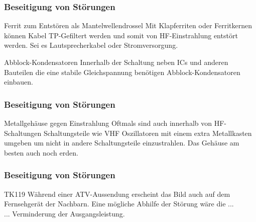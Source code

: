 \begin{frame}
    \frametitle{Beseitigung von Störungen}
    \begin{center}
	\begin{block}{Ferrit zum Entstören als Mantelwellendrossel}
		Mit Klapferriten oder Ferritkernen können Kabel TP-Gefiltert werden und somit von HF-Einstrahlung entstört werden. Sei es Lautsprecherkabel oder Stromversorgung.
	\end{block}
	\begin{block}{Abblock-Kondensatoren}
		Innerhalb der Schaltung neben ICs und anderen Bauteilen die eine stabile Gleichspannung benötigen Abblock-Kondensatoren einbauen.
	\end{block}
    \end{center}
\end{frame}

\begin{frame}
    \frametitle{Beseitigung von Störungen}
    \begin{center}
	\begin{block}{Metallgehäuse gegen Einstrahlung}
		Oftmals sind auch innerhalb von HF-Schaltungen Schaltungsteile wie VHF Oszillatoren mit einem extra Metallkasten umgeben um nicht in andere Schaltungsteile einzustrahlen. Das Gehäuse am besten auch noch erden.
	\end{block}
    \end{center}
\end{frame}

\begin{frame}
    \frametitle{Beseitigung von Störungen}
    \begin{center}
	\begin{block}{TK119}
	Während einer ATV-Aussendung erscheint das Bild auch auf dem Fernsehgerät der Nachbarn. Eine mögliche Abhilfe der Störung wäre die ... \\[3em]
	... Verminderung der Ausgangsleistung.
	\end{block}
    \end{center}
\end{frame}

